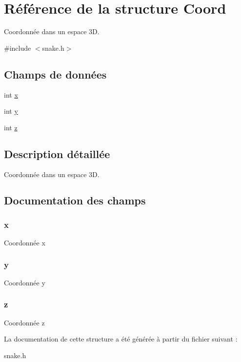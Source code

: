\hypertarget{struct_coord}{\section{Référence de la structure Coord}
\label{struct_coord}
}


Coordonnée dans un espace 3\-D.  




{\ttfamily \#include $<$snake.\-h$>$}

\subsection*{Champs de données}
\begin{DoxyCompactItemize}
\item 
int \hyperlink{struct_coord_a9336ebf25087d91c818ee6e9ec29f8c1}{x}
\item 
int \hyperlink{struct_coord_a2fb1c5cf58867b5bbc9a1b145a86f3a0}{y}
\item 
int \hyperlink{struct_coord_a25ed1bcb423b0b7200f485fc5ff71c8e}{z}
\end{DoxyCompactItemize}


\subsection{Description détaillée}
Coordonnée dans un espace 3\-D. 

\subsection{Documentation des champs}
\hypertarget{struct_coord_a9336ebf25087d91c818ee6e9ec29f8c1}{
\subsubsection[{x}]{\setlength{\rightskip}{0pt plus 5cm}x}}\label{struct_coord_a9336ebf25087d91c818ee6e9ec29f8c1}
Coordonnée x \hypertarget{struct_coord_a2fb1c5cf58867b5bbc9a1b145a86f3a0}{
\subsubsection[{y}]{\setlength{\rightskip}{0pt plus 5cm}y}}\label{struct_coord_a2fb1c5cf58867b5bbc9a1b145a86f3a0}
Coordonnée y \hypertarget{struct_coord_a25ed1bcb423b0b7200f485fc5ff71c8e}{
\subsubsection[{z}]{\setlength{\rightskip}{0pt plus 5cm}z}}\label{struct_coord_a25ed1bcb423b0b7200f485fc5ff71c8e}
Coordonnée z 

La documentation de cette structure a été générée à partir du fichier suivant \-:\begin{DoxyCompactItemize}
\item 
snake.\-h\end{DoxyCompactItemize}
